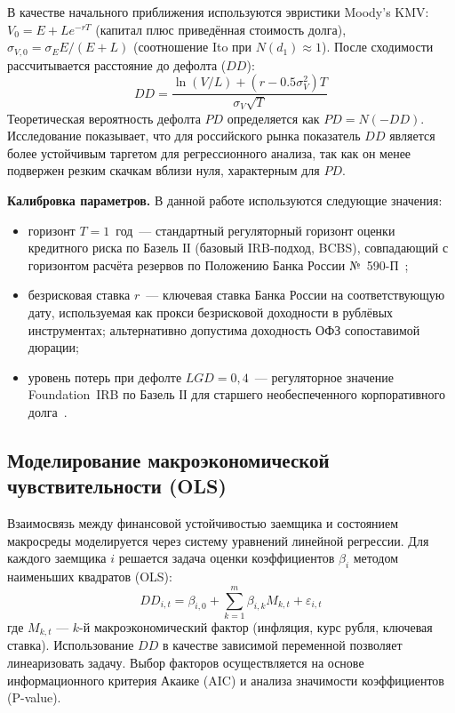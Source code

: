 \documentclass[]{article}
\begin{document}
	В качестве начального приближения используются эвристики Moody's KMV:
	$V_0 = E + L e^{-rT}$ (капитал плюс приведённая стоимость долга),
	$\sigma_{V,0} = \sigma_E E / (E + L)$ (соотношение Ito при $N(d_1) \approx 1$).
	После сходимости рассчитывается расстояние до дефолта ($DD$):
	\begin{equation}
		DD = \frac{\ln(V/L) + (r - 0.5\sigma_V^2)T}{\sigma_V\sqrt{T}}
	\end{equation}
	Теоретическая вероятность дефолта $PD$ определяется как $PD = N(-DD)$. Исследование показывает,
	что для российского рынка показатель $DD$ является более устойчивым таргетом для регрессионного
	анализа, так как он менее подвержен резким скачкам вблизи нуля, характерным для $PD$.

	\textbf{Калибровка параметров.} В данной работе используются следующие значения:
	\begin{itemize}
		\item горизонт $T = 1$~год~--- стандартный регуляторный горизонт оценки кредитного
		      риска по Базель ІІ (базовый IRB-подход, BCBS), совпадающий с горизонтом расчёта резервов
		      по Положению Банка России №~590-П~\cite{cbr590p};
		\item безрисковая ставка $r$~--- ключевая ставка Банка России на соответствующую дату,
		      используемая как прокси безрисковой доходности в рублёвых инструментах; альтернативно
		      допустима доходность ОФЗ сопоставимой дюрации;
		\item уровень потерь при дефолте $LGD = 0{,}4$~--- регуляторное значение Foundation~IRB по Базель ІІ
		      для старшего необеспеченного корпоративного долга~\cite{bcbs2006}.
	\end{itemize}

	\subsection{Моделирование макроэкономической чувствительности (OLS)}

	Взаимосвязь между финансовой устойчивостью заемщика и состоянием макросреды моделируется через
	систему уравнений линейной регрессии. Для каждого заемщика $i$ решается задача оценки коэффициентов
	$\beta_i$ методом наименьших квадратов (OLS):
	\begin{equation}
		\label{ols_eq}
		DD_{i,t} = \beta_{i,0} + \sum_{k=1}^m \beta_{i,k} M_{k,t} + \varepsilon_{i,t}
	\end{equation}
	где $M_{k,t}$ --- $k$-й макроэкономический фактор (инфляция, курс рубля, ключевая ставка). Использование
	$DD$ в качестве зависимой переменной позволяет линеаризовать задачу. Выбор факторов осуществляется
	на основе информационного критерия Акаике (AIC) и анализа значимости коэффициентов (P-value).
\end{document}
